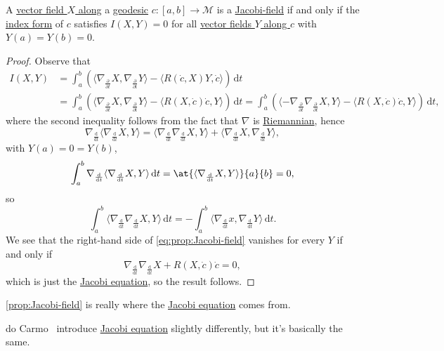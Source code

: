 \begin{proposition}\label{prop:Jacobi-field}
	A \hyperref[def:vector-field-along-curve]{vector field \(X\) along} a \hyperref[def:geodesic]{geodesic} \(c\colon [a, b] \to \mathcal{M} \) is a \hyperref[def:Jacobi-field]{Jacobi-field} if and only if the \hyperref[def:index-form]{index form} of \(c\) satisfies \(I(X, Y) = 0\) for all \hyperref[def:vector-field-along-curve]{vector fields \(Y\) along \(c\)} with \(Y(a) = Y(b) = 0\).
\end{proposition}
\begin{proof}
	Observe that
	\begin{equation}\label{eq:prop:Jacobi-field}
		\begin{split}
			I(X, Y)
			&= \int_{a}^{b} \left( \langle \nabla _{\frac{\partial }{\partial t} } X, \nabla _{\frac{\partial }{\partial t} } Y \rangle - \langle R(\dot{c} , X) Y, \dot{c} \rangle \right)  \,\mathrm{d}t\\
			&= \int_{a}^{b} \left( \langle \nabla _{\frac{\partial }{\partial t} } X, \nabla _{\frac{\partial }{\partial t} } Y \rangle - \langle R(X, \dot{c}) \dot{c}, Y \rangle \right)  \,\mathrm{d}t
			= \int_{a}^{b} \left( \langle -\nabla _{\frac{\partial }{\partial t} } \nabla _{\frac{\partial }{\partial t} } X, Y \rangle - \langle R(X, \dot{c}) \dot{c}, Y \rangle \right)  \,\mathrm{d}t,
		\end{split}
	\end{equation}
	where the second inequality follows from the fact that \(\nabla \) is \hyperref[def:Riemannian]{Riemannian}, hence
	\[
		\nabla _{\frac{\mathrm{d} }{\mathrm{d} t} } \langle \nabla _{\frac{\mathrm{d} }{\mathrm{d} t} }X, Y \rangle
		= \langle \nabla _{\frac{\mathrm{d}}{\mathrm{d}t}} \nabla _{\frac{\mathrm{d}}{\mathrm{d}t} } X, Y \rangle + \langle \nabla _{\frac{\mathrm{d}}{\mathrm{d}t} } X, \nabla _{\frac{\mathrm{d}}{\mathrm{d}t} } Y \rangle,
	\]
	with \(Y(a) = 0 = Y(b)\),
	\[
		\int_{a}^{b} \nabla _{\frac{\mathrm{d} }{\mathrm{d} t} } \langle \nabla _{\frac{\mathrm{d} }{\mathrm{d} t} }X, Y \rangle  \,\mathrm{d}t
		= \at{\langle \nabla _{\frac{\mathrm{d}}{\mathrm{d}t} } X, Y\rangle }{a}{b} = 0,
	\]
	so
	\[
		\int_{a}^{b} \langle \nabla _{\frac{\mathrm{d}}{\mathrm{d}t} } \nabla _{\frac{\mathrm{d}}{\mathrm{d}t} } X, Y\rangle  \,\mathrm{d}t
		= - \int_{a}^{b} \langle \nabla _{\frac{\mathrm{d}}{\mathrm{d}t} } x, \nabla _{\frac{\mathrm{d}}{\mathrm{d}t} } Y \rangle  \,\mathrm{d}t.
	\]
	We see that the right-hand side of \autoref{eq:prop:Jacobi-field} vanishes for every \(Y\) if and only if
	\[
		\nabla _{\frac{\mathrm{d}}{\mathrm{d}t} }\nabla _{\frac{\mathrm{d}}{\mathrm{d}t} }X + R(X, \dot{c} )\dot{c} = 0,
	\]
	which is just the \hyperref[eq:Jacobi]{Jacobi equation}, so the result follows.
\end{proof}

\begin{intuition}
	\autoref{prop:Jacobi-field} is really where the \hyperref[eq:Jacobi]{Jacobi equation} comes from.
\end{intuition}

\begin{remark}
	do Carmo~\cite{flaherty2013riemannian} introduce \hyperref[eq:Jacobi]{Jacobi equation} slightly differently, but it's basically the same.
\end{remark}